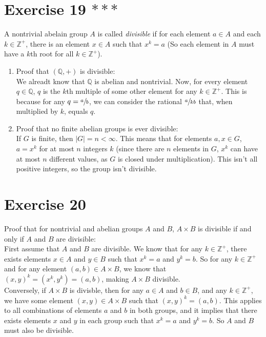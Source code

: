 \documentclass[12pt]{article}
\newcommand{\Z}{\mathbb{Z}}
\newcommand{\Q}{\mathbb{Q}}
\begin{document}
    \section*{Exercise 19 $***$}
    A nontrivial abelain group $A$ is called \textit{divisible}
    if for each element $a \in A$ and each $k \in \Z^+$,
    there is an element $x \in A$ such that $x^k = a$
    (So each element in $A$ must have a $k$th root for all $k \in \Z^+$).
    \begin{enumerate}[label=\textbf{\alph*.}]
        \item
            Proof that $(\Q, +)$ is divisible: \\
            We alreadt know that $\Q$ is abelian and nontrivial.
            Now, for every element $q \in \Q$,
            $q$ is the $k$th multiple of some other element 
            for any $k \in \Z^+$.
            This is because for any $q = \sfrac{a}{b}$,
            we can consider the rational $\sfrac{a}{kb}$
            that, when multiplied by $k$,
            equals $q$.
        \item
            Proof that no finite abelian groups is ever divisible: \\
            If $G$ is finite,
            then $|G| = n < \infty$.
            This means that for elements $a, x \in G$,
            $a = x^k$ for at most $n$ integers $k$
            (since there are $n$ elements in $G$,
            $x^k$ can have at most $n$ different values,
            as $G$ is closed under multiplication).
            This isn't all positive integers,
            so the group isn't divisible.
    \end{enumerate}


    \section*{Exercise 20}
    Proof that for nontrivial and abelian groups $A$ and $B$,
    $A \times B$ is divisible if and only if $A$ and $B$ are divisible: \\
    First assume that $A$ and $B$ are divisible.
    We know that for any $k \in \Z^+$,
    there exists elements $x \in A$ and $y \in B$
    such that $x^k = a$ and $y^k = b$.
    So for any $k \in \Z^+$ and for any element $(a, b) \in A \times B$,
    we know that $(x, y)^k = (x^k, y^k) = (a, b)$,
    making $A \times B$ divisible. \\
    Conversely, if $A \times B$ is divisble,
    then for any $a \in A$ and $b \in B$,
    and any $k \in \Z^+$,
    we have some element $(x, y) \in A \times B$
    such that $(x, y)^k = (a, b)$.
    This applies to all combinations of elements $a$ and $b$
    in both groups,
    and it implies that there exists elements $x$ and $y$
    in each group such that $x^k = a$ and $y^k = b$.
    So $A$ and $B$ must also be divisible.

    
\end{document}
